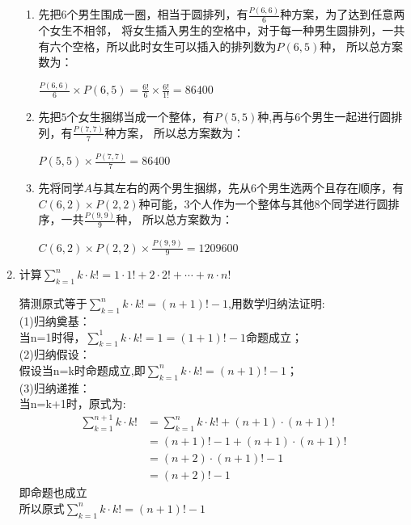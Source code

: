 \documentclass[a4paper]{article}
\begin{document}
\begin{enumerate}
\begin{solution}
      \begin{enumerate}
        \item 先把$6$个男生围成一圈，相当于圆排列，有$\frac{P(6,6)}{6}$种方案，为了达到任意两个女生不相邻，
              将女生插入男生的空格中，对于每一种男生圆排列，一共有六个空格，所以此时女生可以插入的排列数为$P(6,5)$种，
              所以总方案数为：\\
              \begin{center}
                  $\frac{P(6,6)}{6}\times P(6,5)=\frac{6!}{6}\times \frac{6!}{1!}=86400$ 
              \end{center}
              
        \item 先把$5$个女生捆绑当成一个整体，有$P(5,5)$种,再与$6$个男生一起进行圆排列，有$\frac{P(7,7)}{7}$种方案，
              所以总方案数为：\\
              \begin{center}
            $P(5,5)\times \frac{P(7,7)}{7}=86400$ 
              \end{center}
        \item 先将同学$A$与其左右的两个男生捆绑，先从$6$个男生选两个且存在顺序，有$C(6,2)\times P(2,2)$种可能，3个人作为一个整体与其他8个同学进行圆排序，一共$\frac{P(9,9)}{9}$种，
              所以总方案数为：\\
              \begin{center}
            $C(6,2)\times P(2,2)\times \frac{P(9,9)}{9}=1209600$
              \end{center}
    \end{enumerate}
\end{solution}

\item 计算$\sum_{k=1}^nk\cdot k!=1\cdot1!+2\cdot2!+\cdots+n\cdot n!$ 
\begin{solution}
      \begin{enumerate}
            猜测原式等于$\sum_{k=1}^nk\cdot k!=(n+1)!-1$,用数学归纳法证明:\\
            (1)归纳奠基：\\当n=1时得，$\sum_{k=1}^1k\cdot k!=1=(1+1)!-1$命题成立；\\ 
            (2)归纳假设：\\假设当n=k时命题成立,即$\sum_{k=1}^nk\cdot k!=(n+1)!-1$；\\ 
            (3)归纳递推：\\
            当n=k+1时，原式为:
            \begin{align*}
                  \sum_{k=1}^{n+1}k\cdot k!&=\sum_{k=1}^nk\cdot k!+(n+1)\cdot (n+1)! \\
                  &=(n+1)!-1+(n+1)\cdot (n+1)!\\
                  &=(n+2)\cdot (n+1)!-1\\
                  &=(n+2)!-1
            \end{align*}
            即命题也成立\\
            所以原式$\sum_{k=1}^nk\cdot k!=(n+1)!-1$
    \end{enumerate}
\end{solution}


\end{enumerate}
\end{document}
